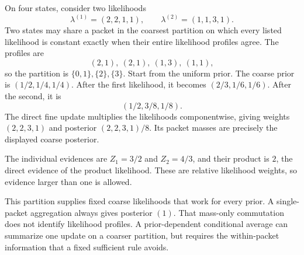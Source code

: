 On four states, consider two likelihoods
\[
\lambda^{(1)}=(2,2,1,1),\qquad
\lambda^{(2)}=(1,1,3,1).
\]
Two states may share a packet in the coarsest partition on which every listed likelihood is constant exactly when their entire likelihood profiles agree. The profiles are
\[
(2,1),\ (2,1),\ (1,3),\ (1,1),
\]
so the partition is $\{0,1\},\{2\},\{3\}$.
Start from the uniform prior. The coarse prior is $(1/2,1/4,1/4)$. After the first likelihood, it becomes $(2/3,1/6,1/6)$. After the second, it is
\[
(1/2,3/8,1/8).
\]
The direct fine update multiplies the likelihoods componentwise, giving weights $(2,2,3,1)$ and posterior $(2,2,3,1)/8$. Its packet masses are precisely the displayed coarse posterior.

The individual evidences are $Z_1=3/2$ and $Z_2=4/3$, and their product is $2$, the direct evidence of the product likelihood. These are relative likelihood weights, so evidence larger than one is allowed.

This partition supplies fixed coarse likelihoods that work for every prior. A single-packet aggregation always gives posterior $(1)$. That mass-only commutation does not identify likelihood profiles. A prior-dependent conditional average can summarize one update on a coarser partition, but requires the within-packet information that a fixed sufficient rule avoids.


